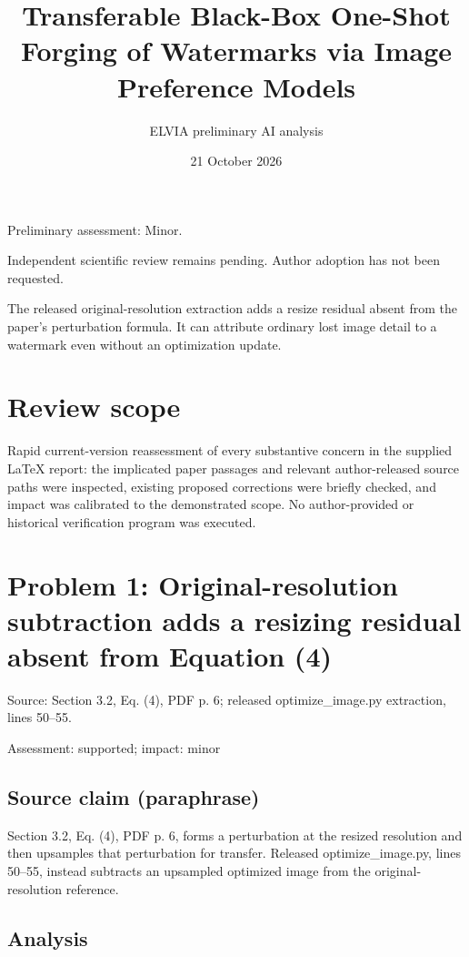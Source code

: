 \documentclass[11pt]{article}
\begin{document}
\title{Transferable Black-Box One-Shot Forging of Watermarks via Image Preference Models}

\author{ELVIA preliminary AI analysis}\date{21 October 2026}\maketitle

Preliminary assessment: Minor.\par

Independent scientific review remains pending. Author adoption has not been requested.

The released original-resolution extraction adds a resize residual absent from the paper's perturbation formula. It can attribute ordinary lost image detail to a watermark even without an optimization update.

\section*{Review scope}

Rapid current-version reassessment of every substantive concern in the supplied LaTeX report: the implicated paper passages and relevant author-released source paths were inspected, existing proposed corrections were briefly checked, and impact was calibrated to the demonstrated scope. No author-provided or historical verification program was executed.

\section*{Problem 1: Original-resolution subtraction adds a resizing residual absent from Equation (4)}

Source: Section 3.2, Eq. (4), PDF p. 6; released optimize\_image.py extraction, lines 50–55.

Assessment: supported; impact: minor

\subsection*{Source claim (paraphrase)}

Section 3.2, Eq. (4), PDF p. 6, forms a perturbation at the resized resolution and then upsamples that perturbation for transfer. Released optimize\_image.py, lines 50–55, instead subtracts an upsampled optimized image from the original-resolution reference.

\subsection*{Analysis}
\end{document}
